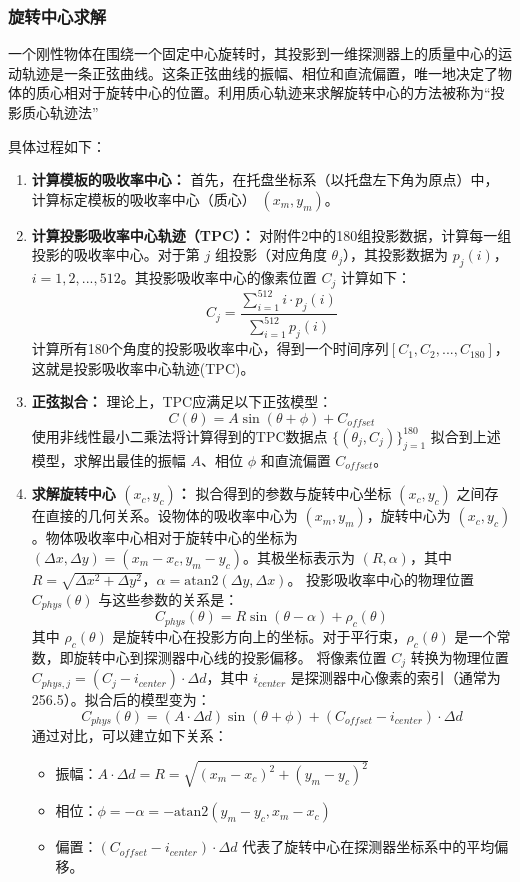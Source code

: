 \subsubsection{旋转中心求解}

一个刚性物体在围绕一个固定中心旋转时，其投影到一维探测器上的质量中心的运动轨迹是一条正弦曲线。这条正弦曲线的振幅、相位和直流偏置，唯一地决定了物体的质心相对于旋转中心的位置。利用质心轨迹来求解旋转中心的方法被称为“投影质心轨迹法”\par
具体过程如下：
\begin{enumerate}
    \item \textbf{计算模板的吸收率中心：} 首先，在托盘坐标系（以托盘左下角为原点）中，计算标定模板的吸收率中心（质心） $(x_m,y_m)$。
    \item \textbf{计算投影吸收率中心轨迹（TPC）：} 对附件2中的180组投影数据，计算每一组投影的吸收率中心。对于第 $j$ 组投影（对应角度 $\theta_j$），其投影数据为 $p_j(i)$，$i=1,2,...,512$。其投影吸收率中心的像素位置 $C_j$ 计算如下：
       $$C_j=\frac{\sum_{i=1}^{512}i\cdot p_j(i)}{\sum_{i=1}^{512}p_j(i)}$$
       计算所有180个角度的投影吸收率中心，得到一个时间序列$[C_1,C_2,...,C_{180}]$，这就是投影吸收率中心轨迹(TPC)。
    \item \textbf{正弦拟合：} 理论上，TPC应满足以下正弦模型：
       $$C(\theta)=A\sin(\theta+\phi)+C_{offset}$$
       使用非线性最小二乘法将计算得到的TPC数据点 $\{(\theta_j,C_j)\}_{j=1}^{180}$ 拟合到上述模型，求解出最佳的振幅 $A$、相位 $\phi$ 和直流偏置 $C_{offset}$。
    \item \textbf{求解旋转中心 $(x_c,y_c)$：} 拟合得到的参数与旋转中心坐标 $(x_c,y_c)$ 之间存在直接的几何关系。设物体的吸收率中心为 $(x_m,y_m)$，旋转中心为 $(x_c,y_c)$。物体吸收率中心相对于旋转中心的坐标为 $(\Delta x,\Delta y)=(x_m-x_c,y_m-y_c)$。其极坐标表示为 $(R,\alpha)$，其中 $R=\sqrt{\Delta x^2+\Delta y^2}$，$\alpha=\text{atan2}(\Delta y,\Delta x)$。
       投影吸收率中心的物理位置 $C_{phys}(\theta)$ 与这些参数的关系是：
       $$C_{phys}(\theta)=R\sin(\theta-\alpha)+\rho_c(\theta)$$
       其中 $\rho_c(\theta)$ 是旋转中心在投影方向上的坐标。对于平行束，$\rho_c(\theta)$ 是一个常数，即旋转中心到探测器中心线的投影偏移。
       将像素位置 $C_j$ 转换为物理位置 $C_{phys,j}=(C_j-i_{center})\cdot\Delta d$，其中 $i_{center}$ 是探测器中心像素的索引（通常为256.5）。拟合后的模型变为：
       $$C_{phys}(\theta)=(A\cdot\Delta d)\sin(\theta+\phi)+(C_{offset}-i_{center})\cdot\Delta d$$
       通过对比，可以建立如下关系：
       \begin{itemize}
           \item 振幅：$A\cdot\Delta d=R=\sqrt{(x_m-x_c)^2+(y_m-y_c)^2}$
           \item 相位：$\phi=-\alpha=-\text{atan2}(y_m-y_c,x_m-x_c)$
           \item 偏置：$(C_{offset}-i_{center})\cdot\Delta d$ 代表了旋转中心在探测器坐标系中的平均偏移。
       \end{itemize}
\end{enumerate}

